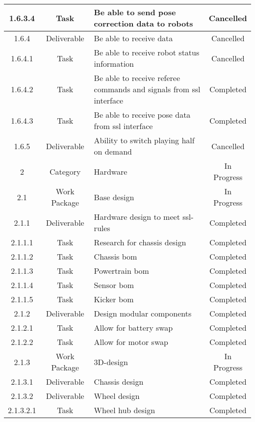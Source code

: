 \begin{longtable}{|c|c|m{}|c|}
    \rowcolor{c} 1.6.3.4 & Task & Be able to send pose correction data to robots & Cancelled \\ \hline
    \rowcolor{c} 1.6.4 & Deliverable & Be able to receive data & Cancelled \\ \hline
    \rowcolor{c} 1.6.4.1 & Task & Be able to receive robot status information & Cancelled \\ \hline
    \rowcolor{d} 1.6.4.2 & Task & Be able to receive referee commands and signals from \acs{ssl} interface & Completed \\ \hline
    \rowcolor{d} 1.6.4.3 & Task & Be able to receive pose data from \acs{ssl} interface & Completed \\ \hline
    \rowcolor{c} 1.6.5 & Deliverable & Ability to switch playing half on demand & Cancelled \\ \hline
    \rowcolor{p} 2 & Category & Hardware & In Progress \\ \hline
    \rowcolor{p} 2.1 & Work Package & Base design & In Progress \\ \hline
    \rowcolor{d} 2.1.1 & Deliverable & Hardware design to meet \acs{ssl}-rules & Completed \\ \hline
    \rowcolor{d} 2.1.1.1 & Task & Research for chassis design & Completed \\ \hline
    \rowcolor{d} 2.1.1.2 & Task & Chassis \acs{bom} & Completed \\ \hline
    \rowcolor{d} 2.1.1.3 & Task & Powertrain \acs{bom} & Completed \\ \hline
    \rowcolor{d} 2.1.1.4 & Task & Sensor \acs{bom} & Completed \\ \hline
    \rowcolor{d} 2.1.1.5 & Task & Kicker \acs{bom} & Completed \\ \hline
    \rowcolor{d} 2.1.2 & Deliverable & Design modular components & Completed \\ \hline
    \rowcolor{d} 2.1.2.1 & Task & Allow for battery swap & Completed \\ \hline
    \rowcolor{d} 2.1.2.2 & Task & Allow for motor swap & Completed \\ \hline
    \rowcolor{p} 2.1.3 & Work Package & 3D-design & In Progress \\ \hline
    \rowcolor{d} 2.1.3.1 & Deliverable & Chassis design & Completed \\ \hline
    \rowcolor{d} 2.1.3.2 & Deliverable & Wheel design & Completed \\ \hline
    \rowcolor{d} 2.1.3.2.1 & Task & Wheel hub design & Completed \\ \hline

\end{longtable}
